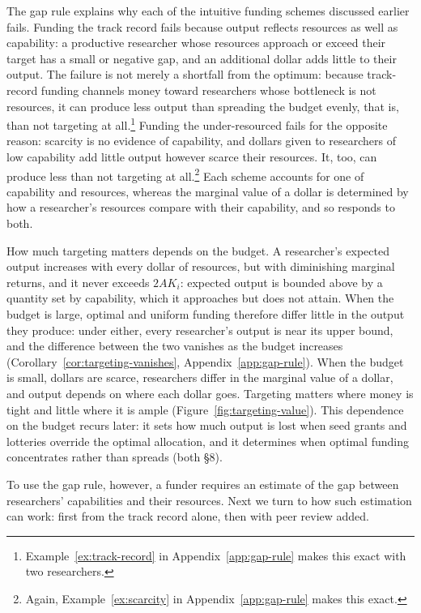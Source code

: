 \documentclass[article, 11pt, reqno]{amsart}
\theoremstyle{named}
\begin{document}
The gap rule explains why each of the intuitive funding schemes discussed earlier fails. Funding the track record fails because output reflects resources as well as capability: a productive researcher whose resources approach or exceed their target has a small or negative gap, and an additional dollar adds little to their output. The failure is not merely a shortfall from the optimum: because track-record funding channels money toward researchers whose bottleneck is not resources, it can produce less output than spreading the budget evenly, that is, than not targeting at all.\footnote{Example~\ref{ex:track-record} in Appendix~\ref{app:gap-rule} makes this exact with two researchers.} Funding the under-resourced fails for the opposite reason: scarcity is no evidence of capability, and dollars given to researchers of low capability add little output however scarce their resources. It, too, can produce less than not targeting at all.\footnote{Again, Example~\ref{ex:scarcity} in Appendix~\ref{app:gap-rule} makes this exact.} Each scheme accounts for one of capability and resources, whereas the marginal value of a dollar is determined by how a researcher's resources compare with their capability, and so responds to both.

How much targeting matters depends on the budget. A researcher's expected output increases with every dollar of resources, but with diminishing marginal returns, and it never exceeds $2AK_i$: expected output is bounded above by a quantity set by capability, which it approaches but does not attain. When the budget is large, optimal and uniform funding therefore differ little in the output they produce: under either, every researcher's output is near its upper bound, and the difference between the two vanishes as the budget increases (Corollary~\ref{cor:targeting-vanishes}, Appendix~\ref{app:gap-rule}). When the budget is small, dollars are scarce, researchers differ in the marginal value of a dollar, and output depends on where each dollar goes. Targeting matters where money is tight and little where it is ample (Figure~\ref{fig:targeting-value}). This dependence on the budget recurs later: it sets how much output is lost when seed grants and lotteries override the optimal allocation, and it determines when optimal funding concentrates rather than spreads (both \S8).



To use the gap rule, however, a funder requires an estimate of the gap between researchers' capabilities and their resources. Next we turn to how such estimation can work: first from the track record alone, then with peer review added.
\end{document}
